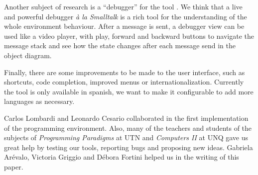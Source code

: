 \documentclass{sigplanconf}
\begin{document}
Another subject of research is a ``debugger'' for the tool \cite{Benn10}. We think that a live and powerful debugger \textit{à la Smalltalk} is a rich tool for the understanding of the whole environment behaviour. 
After a message is sent, a debugger view can be used like a video player, with play, forward and  backward buttons to navigate the message stack and see how the state changes after each message send in the object diagram.

Finally, there are some improvements to be made to the user interface, such as shortcuts, code completion, improved menus or internationalization. Currently the tool is only available in spanish, we want to make it configurable to add more languages as necessary.

\acks

Carlos Lombardi and Leonardo Cesario collaborated in the first implementation of the programming environment. Also, many of the teachers and students of the subjects of \textit{Programming Paradigms} at UTN and \textit{Computers II} at UNQ gave us great help by testing our tools, reporting bugs and proposing new ideas. Gabriela Arévalo, Victoria Griggio and Débora Fortini helped us in the writing of this paper.

\nocite{Libe11,Mich00,Kouz07,Shan06,Shch95}


%
\end{document}
